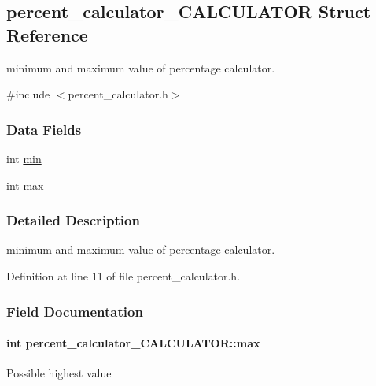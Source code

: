 \hypertarget{a00006}{\subsection{percent\-\_\-calculator\-\_\-\-C\-A\-L\-C\-U\-L\-A\-T\-O\-R Struct Reference}
\label{a00006}
}


minimum and maximum value of percentage calculator.  




{\ttfamily \#include $<$percent\-\_\-calculator.\-h$>$}

\subsubsection*{Data Fields}
\begin{DoxyCompactItemize}
\item 
int \hyperlink{a00006_ac08616554fb94f35aa4ef42906c79b6a}{min}
\item 
int \hyperlink{a00006_a1ce078b450197ee12c11779350e90c73}{max}
\end{DoxyCompactItemize}


\subsubsection{Detailed Description}
minimum and maximum value of percentage calculator. 

Definition at line 11 of file percent\-\_\-calculator.\-h.



\subsubsection{Field Documentation}
\hypertarget{a00006_a1ce078b450197ee12c11779350e90c73}{
\paragraph[{max}]{\setlength{\rightskip}{0pt plus 5cm}int percent\-\_\-calculator\-\_\-\-C\-A\-L\-C\-U\-L\-A\-T\-O\-R\-::max}}\label{a00006_a1ce078b450197ee12c11779350e90c73}
Possible highest value 

